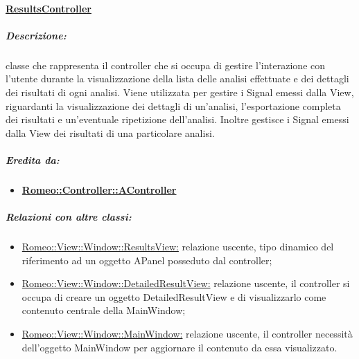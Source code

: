 		\paragraph{\underline{ResultsController}}
		\label{controller_vr} 
			\subparagraph{Descrizione:} classe che rappresenta il controller che si occupa di gestire l'interazione con l'utente durante la visualizzazione della lista delle analisi effettuate e dei dettagli dei risultati di ogni analisi. Viene utilizzata per gestire i Signal emessi dalla View, riguardanti la visualizzazione dei dettagli di un'analisi, l'esportazione completa dei risultati e un'eventuale ripetizione dell'analisi. Inoltre gestisce i Signal\g{} emessi dalla View dei risultati di una particolare analisi.
			\subparagraph{Eredita da:} 
				\begin{itemize}
					\item \textbf{\hyperref[controller_a]{Romeo::Controller::AController}}
				\end{itemize}
			\subparagraph{Relazioni con altre classi:}
				\begin{itemize}
					\item \hyperref[vrv]{Romeo::View::Window::ResultsView:} relazione uscente, tipo dinamico del riferimento ad un oggetto APanel posseduto dal controller;
					\item \hyperref[drv]{Romeo::View::Window::DetailedResultView:} relazione uscente, il controller si occupa di creare un oggetto DetailedResultView e di visualizzarlo come contenuto centrale della MainWindow;
					\item \hyperref[mainview]{Romeo::View::Window::MainWindow:} relazione uscente, il controller necessità dell'oggetto MainWindow per aggiornare il contenuto da essa visualizzato.
				\end{itemize}